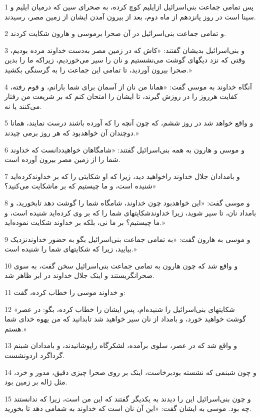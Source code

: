 \par 1 پس تمامی جماعت بنی‌اسرائیل ازایلیم کوچ کرده، به صحرای سین که درمیان ایلیم و سینا است در روز پانزدهم از ماه دوم، بعد از بیرون آمدن ایشان از زمین مصر، رسیدند.
\par 2 و تمامی جماعت بنی‌اسرائیل در آن صحرا برموسی و هارون شکایت کردند.
\par 3 و بنی‌اسرائیل بدیشان گفتند: «کاش که در زمین مصر به‌دست خداوند مرده بودیم، وقتی که نزد دیگهای گوشت می‌نشستیم و نان را سیر می‌خوردیم، زیراکه ما را بدین صحرا بیرون آوردید، تا تمامی این جماعت را به گرسنگی بکشید.»
\par 4 آنگاه خداوند به موسی گفت: «همانا من نان از آسمان برای شما بارانم، و قوم رفته، کفایت هرروز را در روزش گیرند، تا ایشان را امتحان کنم که بر شریعت من رفتار می‌کنند یا نه.
\par 5 و واقع خواهد شد در روز ششم، که چون آنچه را که آورده باشند درست نمایند، همانا دوچندان آن خواهدبود که هر روز برمی چیدند.»
\par 6 و موسی و هارون به همه بنی‌اسرائیل گفتند: «شامگاهان خواهیددانست که خداوند شما را از زمین مصر بیرون آورده است.
\par 7 و بامدادان جلال خداوند راخواهید دید، زیرا که او شکایتی را که بر خداوندکرده‌اید شنیده است، و ما چیستیم که بر ماشکایت می‌کنید؟»
\par 8 و موسی گفت: «این خواهدبود چون خداوند، شامگاه شما را گوشت دهد تابخورید، و بامداد نان، تا سیر شوید، زیرا خداوندشکایتهای شما را که بر وی کرده‌اید شنیده است، و ما چیستیم؟ بر ما نی، بلکه بر خداوند شکایت نموده‌اید.»
\par 9 و موسی به هارون گفت: «به تمامی جماعت بنی‌اسرائیل بگو به حضور خداوندنزدیک بیایید، زیرا که شکایتهای شما را شنیده است.»
\par 10 و واقع شد که چون هارون به تمامی جماعت بنی‌اسرائیل سخن گفت، به سوی صحرانگریستند و اینک جلال خداوند در ابر ظاهر شد.
\par 11 و خداوند موسی را خطاب کرده، گفت:
\par 12 «شکایتهای بنی‌اسرائیل را شنیده‌ام، پس ایشان را خطاب کرده، بگو: در عصر گوشت خواهید خورد، و بامداد از نان سیر خواهید شد تابدانید که من یهوه خدای شما هستم.»
\par 13 و واقع شد که در عصر، سلوی برآمده، لشکرگاه راپوشانیدند، و بامدادان شبنم گرداگرد اردونشست.
\par 14 و چون شبنمی که نشسته بودبرخاست، اینک بر روی صحرا چیزی دقیق، مدور و خرد، مثل ژاله بر زمین بود.
\par 15 و چون بنی‌اسرائیل این را دیدند به یکدیگر گفتند که این من است، زیرا که ندانستند چه بود. موسی به ایشان گفت: «این آن نان است که خداوند به شمامی دهد تا بخورید.
